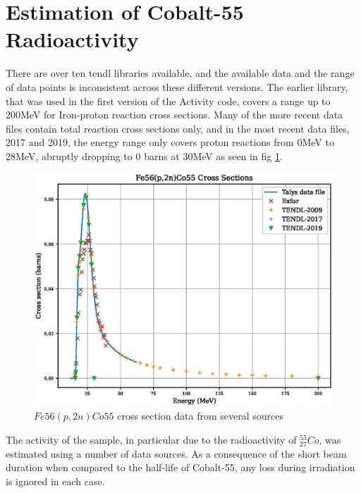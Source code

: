 





\FloatBarrier
\section{Estimation of Cobalt-55 Radioactivity}

There are over ten \acrshort{tendl} libraries available, and the available data and the range of data points is inconsistent across these different versions.  The earlier library, that was used in the first version of the Activity code, covers a range up to 200MeV for Iron-proton reaction cross sections.  Many of the more recent data files contain total reaction cross sections only, and in the most recent data files, 2017 and 2019, the energy range only covers proton reactions from 0MeV to 28MeV, abruptly dropping to 0 barns at 30MeV as seen in fig \ref{fig:fe56co55-cross-sections}.

\FloatBarrier
\begin{figure}[!htb]
\centering
\includegraphics[width=0.7\linewidth]{chapters/activity_code/fe56_co55/Fe56_Co55.eps}
\caption{$Fe56(p,2n)Co55$ cross section data from several sources \cite{tendl2009}\cite{tendl2017}\cite{tendl2019}\cite{exforco55}\cite{talys}}
\label{fig:fe56co55-cross-sections}
\end{figure}
\FloatBarrier

The activity of the sample, in particular due to the radioactivity of ${}^{55}_{27}Co$, was estimated using a number of data sources.  As a consequence of the short beam duration when compared to the half-life of Cobalt-55, any loss during irradiation is ignored in each case.  

